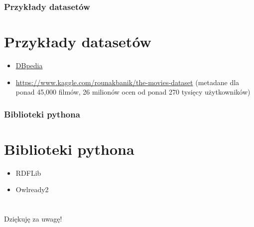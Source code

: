 \documentclass{beamer}
\begin{document}
	\begin{frame}
		\frametitle{Przykłady datasetów}
		\section{Przykłady datasetów}
		\begin{itemize}
			\item \href{https://www.dbpedia.org}{DBpedia}
			\item \url{https://www.kaggle.com/rounakbanik/the-movies-dataset} (metadane dla ponad 45,000 filmów, 26 milionów ocen od ponad 270 tysięcy użytkowników)
		\end{itemize}
	\end{frame}

	\begin{frame}
		\frametitle{Biblioteki pythona}
		\section{Biblioteki pythona}
		\begin{itemize}
			\item RDFLib
			\item Owlready2
		\end{itemize}
	\end{frame}

	\begin{frame}
		\frametitle{}
		\section{}
		\begin{center}
			\Huge Dziękuję za uwagę!
		\end{center}
	\end{frame}
\end{document}
